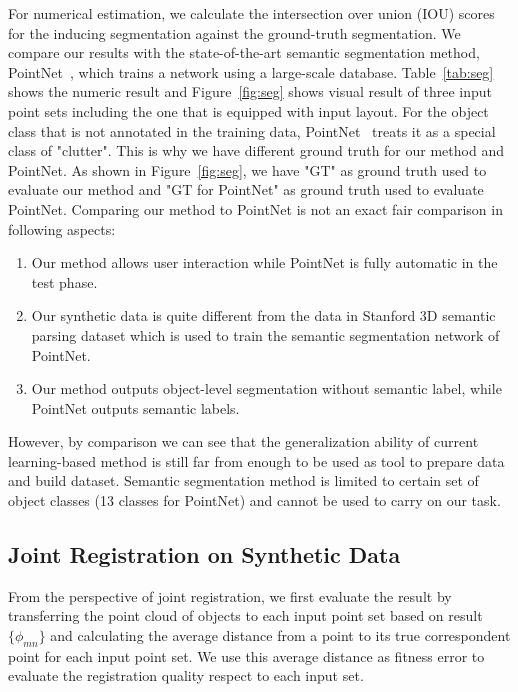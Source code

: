 %
For numerical estimation, we calculate the intersection over union (IOU) scores for the inducing segmentation against the ground-truth segmentation.
% 
We compare our results with the state-of-the-art semantic segmentation method, PointNet~\cite{qi2016pointnet}, which trains a network using a large-scale database. 
%
Table~\ref{tab:seg} shows the numeric result and Figure~\ref{fig:seg} shows visual result of three input point sets including the one that is equipped with input layout.
For the object class that is not annotated in the training data, PointNet~\cite{qi2016pointnet} treats it as a special class of "clutter". This is why we have different ground truth for our method and PointNet. As shown in Figure~\ref{fig:seg}, we have "GT" as ground truth used to evaluate our method and "GT for PointNet" as ground truth used to evaluate PointNet. 
%
Comparing our method to PointNet is not an exact fair comparison in following aspects:
\begin{enumerate}
\item Our method allows user interaction while PointNet is fully automatic in the test phase.
\item Our synthetic data is quite different from the data in Stanford 3D semantic parsing dataset\cite{semsegdataset} which is used to train the semantic segmentation network of PointNet.
\item Our method outputs object-level segmentation without semantic label, while PointNet outputs semantic labels.  
\end{enumerate}
However, by comparison we can see that the generalization ability of current learning-based method is still far from enough to be used as tool to prepare data and build dataset. Semantic segmentation method is limited to certain set of object classes (13 classes for PointNet) and cannot be used to carry on our task. 
\subsection{Joint Registration on Synthetic Data}
From the perspective of joint registration, we first evaluate the result by transferring the point cloud of objects to each input point set based on result $\{\phi_{mn}\}$ and calculating the average distance from a point to its true correspondent point for each input point set.
We use this average distance as fitness error to evaluate the registration quality respect to each input set.

